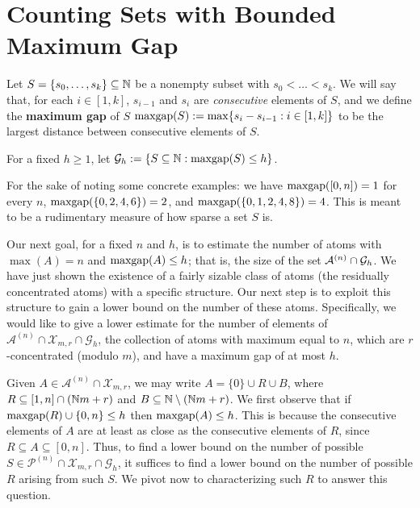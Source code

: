 \section{Counting Sets with Bounded Maximum Gap}

\begin{defn} \label{def:maxgap}
Let $S = \{s_0,\dots, s_k\} \subseteq \mathbb{N}$ be a nonempty subset with $s_0 < \dots < s_k$.
We will say that, for each $i\in [1,k]$, $s_{i-1}$ and $s_i$ are \textit{consecutive} elements of $S$, and we define the \textbf{maximum gap} of $S$ $\operatorname{maxgap}(S) := \max \{s_i - s_{i-1} : i\in [1,k]\}$ to be the largest distance between consecutive elements of $S$.

For a fixed $h\ge 1$, let $\mathcal{G}_h := \{S\subseteq \mathbb{N}: \operatorname{maxgap}(S) \le h\}$.
\end{defn}

For the sake of noting some concrete examples: we have $\operatorname{maxgap}([0,n]) = 1$ for every $n$, $\operatorname{maxgap}(\{0,2,4,6\}) = 2$, and $\operatorname{maxgap}(\{0,1,2,4,8\}) = 4$.
This is meant to be a rudimentary measure of how sparse a set $S$ is.

Our next goal, for a fixed $n$ and $h$, is to estimate the number of atoms with $\max(A) = n$ and $\operatorname{maxgap}(A) \le h$; that is, the size of the set $\mathcal{A}^{(n)}\cap \mathcal{G}_h$.
We have just shown the existence of a fairly sizable class of atoms (the residually concentrated atoms) with a specific structure.  
Our next step is to exploit this structure to gain a lower bound on the number of these atoms.
Specifically, we would like to give a lower estimate for the number of elements of $\mathcal{A}^{(n)}\cap \mathcal{X}_{m,r} \cap \mathcal{G}_h$, the collection of atoms with maximum equal to $n$, which are $r$-concentrated (modulo $m$), and have a maximum gap of at most $h$.

Given $A\in \mathcal{A}^{(n)}\cap \mathcal{X}_{m,r}$, we may write $A = \{0\}\cup R \cup B$, where $R \subseteq [1,n]\cap (\mathbb{N} m+r)$ and $B\subseteq \mathbb{N}\setminus (\mathbb{N} m + r)$.
We first observe that if $\operatorname{maxgap}(R)\cup\{0,n\}\le h$ then $\operatorname{maxgap}(A)\le h$. 
This is because the consecutive elements of $A$ are at least as close as the consecutive elements of $R$, since $R\subseteq A\subseteq [0,n]$.
Thus, to find a lower bound on the number of possible $S\in \mathcal{P}^{(n)}\cap \mathcal{X}_{m,r}\cap \mathcal{G}_h$, it suffices to find a lower bound on the number of possible $R$ arising from such $S$.
We pivot now to characterizing such $R$ to answer this question.


